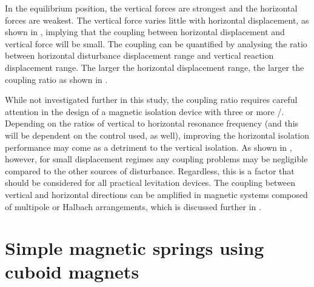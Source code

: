 \documentclass[11pt,a4paper]{memoir}
\begin{document}
In the equilibrium position, the vertical forces are strongest and the
horizontal forces are weakest. The vertical force varies little with
horizontal displacement, as shown in , implying
that the coupling between horizontal displacement and vertical force will be
small.
The coupling can be quantified by analysing the ratio between horizontal
disturbance displacement range and vertical reaction displacement range. The
larger the horizontal displacement range, the larger the coupling ratio as
shown in .

\begin{figure}[b!]
\begin{wide}
  \hfil
\end{wide}
\end{figure}

While not investigated further in this study, the coupling ratio requires careful attention in the design of a magnetic isolation device with three or more \dofs/.
Depending on the ratios of vertical to horizontal resonance frequency (and this will be dependent on the control used, as well), improving the horizontal isolation performance may come as a detriment to the vertical isolation.
As shown in , however, for small displacement regimes any coupling problems may be negligible compared to the other sources of disturbance.
Regardless, this is a factor that should be considered for all practical levitation devices.
The coupling between vertical and horizontal directions can be amplified in magnetic systems composed of multipole or Halbach arrangements, which is discussed further in .

\clearpage
\section{Simple magnetic springs using cuboid magnets}
\end{document}
